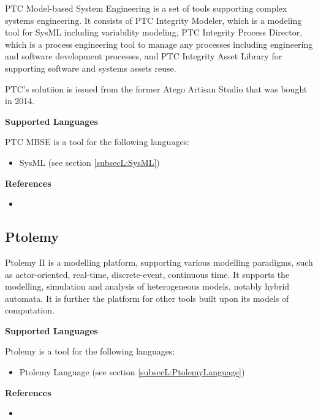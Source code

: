 PTC Model-based System Engineering is a set of tools supporting complex systems engineering. It consists of PTC Integrity Modeler, which is a modeling tool for SysML including variability modeling, PTC Integrity Process Director, which  is a process engineering tool to manage any processes including engineering and software development processes, and PTC Integrity Asset Library for supporting software and systems assets reuse.

PTC's solutiion is issued from the former Atego Artisan Studio that was bought in 2014.

\textbf{Supported Languages}

PTC MBSE is a tool for the following languages:
\begin{itemize}
	\item SysML (see section \ref{subsecL:SysML})
\end{itemize}


\textbf{References}
\begin{itemize}
	
\item {}
\end{itemize}



\subsection{Ptolemy}
\label{subsecT:Ptolemy}


Ptolemy II is a modelling platform, supporting various modelling paradigms, such as actor-oriented, real-time, discrete-event, continuous time. It supports the modelling, simulation and analysis of heterogeneous models, notably hybrid automata. It is further the platform for other tools built upon its models of computation.

\textbf{Supported Languages}

Ptolemy is a tool for the following languages:
\begin{itemize}
	\item Ptolemy Language (see section \ref{subsecL:PtolemyLanguage})
\end{itemize}


\textbf{References}
\begin{itemize}
	
\item {}
\end{itemize}



